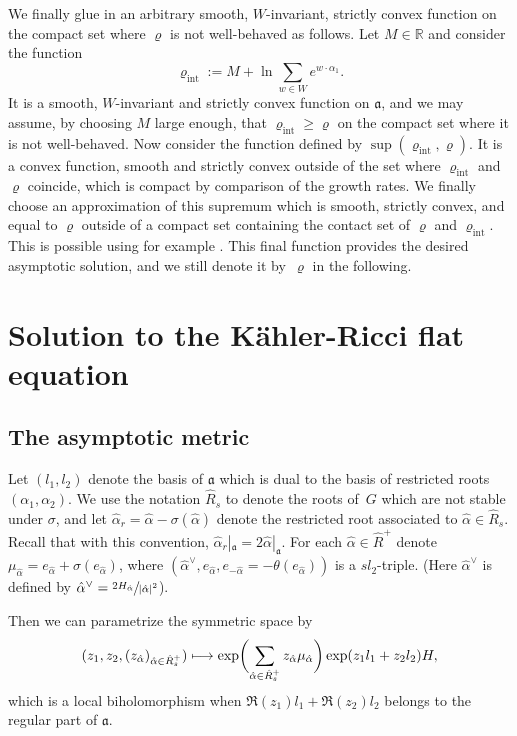 \documentclass[JEP,XML,SOM,Unicode, NoEqCountersInSection, NoFloatCountersInSection]{cedram}
\def\mto{\mathchoice{\longmapsto}{\mapsto}{\mapsto}{\mapsto}}
\theoremstyle{plain}
\theoremstyle{definition}
\newcommand{\fa}{\mathfrak{a}}
\newcommand{\ha}{\hat{\alpha}}
\newcommand{\Roots}{\hat{R}}
\begin{document}
We finally glue in an arbitrary smooth, $W$-invariant, strictly convex function on the compact
set where $\varrho$ is not well-behaved as follows.
Let $M\in \mathbb{R}$ and consider the function
\begin{equation*}
\varrho_{\mathrm{int}}:=M+\ln\sum_{w\in W}e^{w\cdot\alpha_1}.
\end{equation*}
It is a smooth, $W$-invariant and strictly convex function on $\mathfrak{a}$,
and we may assume, by choosing $M$ large enough, that
$\varrho_{\mathrm{int}}\geq \varrho$
on the compact set where it is not well-behaved.
Now consider the function defined by $\sup(\varrho_{\mathrm{int}},\varrho)$.
It is a convex function, smooth and strictly convex outside of the set where
$\varrho_{\mathrm{int}}$ and $\varrho$ coincide, which is compact by comparison
of the growth rates.
We finally choose an approximation of this supremum which is
smooth, strictly convex, and equal to $\varrho$ outside of a compact set containing
the contact set of $\varrho$ and $\varrho_{\mathrm{int}}$.
This is possible using for example \cite{Gho02}.
This final function provides the desired asymptotic solution, and we still denote
it by~$\varrho$ in the following.

\section{Solution to the Kähler-Ricci flat equation}
\label{sec:solut-kahl-ricci}

\subsection{The asymptotic metric}

Let $(l_1,l_2)$ denote the basis of $\fa$ which is dual to the basis of restricted roots $(\alpha_1,\alpha_2)$.
We use the notation $\Roots_s$ to denote the roots of~$G$ which are not stable under $\sigma$,
and let $\ha_r=\ha-\sigma(\ha)$ denote the restricted root associated to $\ha\in\Roots_s$.
Recall that with this convention, $\ha_r|_{\fa}=2\ha|_{\fa}$.
For each $\ha\in \Roots^+$ denote $\mu_{\ha}=e_{\ha}+\sigma(e_{\ha})$, where $(\ha^\vee,e_{\ha},e_{-\ha}=-\theta(e_{\ha}))$ is a $sl_2$-triple.
(Here $\ha^\vee$ is defined by $\ha^\vee=\sfrac{2H_{\ha}}{|\ha|^2}$).

Then we can parametrize the symmetric space by
\begin{equation}
(z_1,z_2,(z_{\ha})_{\ha\in \Roots_s^+}) \mto \exp\biggl( \sum_{\ha\in \Roots_s^+} z_{\ha} \mu_{\ha} \biggr) \exp(z_1 l_1 + z_2 l_2) H,\label{eq:24}
\end{equation}
which is a local biholomorphism when $\Re(z_1) l_1+\Re(z_2)l_2$ belongs to the regular part of $\fa$.
\end{document}
